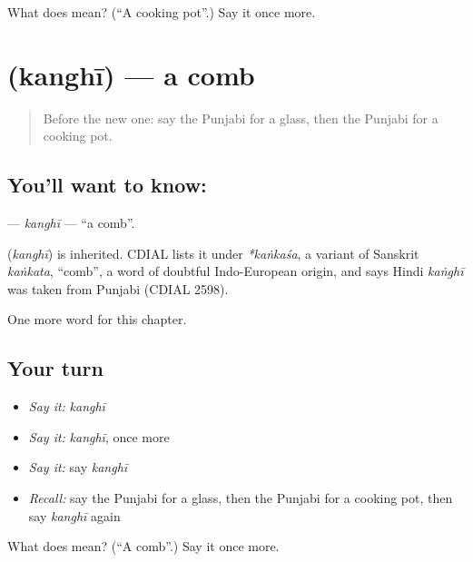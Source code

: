 \begin{tcolorbox}[breakable,colback=teal!4,colframe=teal!35!black,title={Before you move on}]
What does  mean? (\textquotedblleft{}A cooking pot\textquotedblright{}.) Say it once more.
\end{tcolorbox}
\section[\texorpdfstring{\pa{ਕੰਘੀ} (kanghī)}{ਕੰਘੀ (kanghī)}]{ (kanghī) — a comb}

\label{lesson:PA-C113-kanghi}



\begin{quote}
Before the new one: say the Punjabi for a glass, then the Punjabi for a cooking pot.
\end{quote}

\subsection*{You'll want to know: }
\textbf{} — \emph{kanghī} — \textquotedblleft{}a comb\textquotedblright{}.

\begin{cousinweb}
\textbf{} (\emph{kanghī}) is inherited. CDIAL lists it under \emph{*kaṅkaśa}, a variant of Sanskrit \emph{kaṅkata}, \textquotedblleft{}comb\textquotedblright{}, a word of doubtful Indo-European origin, and says Hindi \emph{kaṅghī} was taken from Punjabi (CDIAL 2598).
\end{cousinweb}

\begin{grammarlens}[title={What you've built}]
One more word for this chapter.
\end{grammarlens}

\subsection*{Your turn}
\begin{itemize}
\raggedright
  \item \emph{Say it:} \emph{kanghī}
  \item \emph{Say it:} \emph{kanghī}, once more
  \item \emph{Say it:} say \emph{kanghī}
  \item \emph{Recall:} say the Punjabi for a glass, then the Punjabi for a cooking pot, then say \emph{kanghī} again
\end{itemize}

\begin{tcolorbox}[breakable,colback=teal!4,colframe=teal!35!black,title={Before you move on}]
What does  mean? (\textquotedblleft{}A comb\textquotedblright{}.) Say it once more.
\end{tcolorbox}
